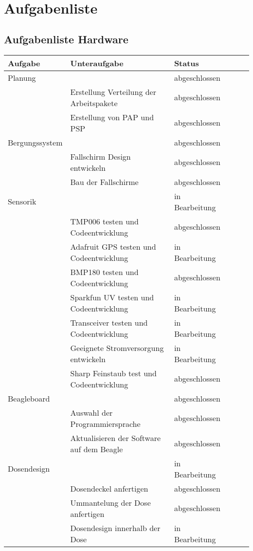 \section{Aufgabenliste}

\subsection{Aufgabenliste Hardware}
\begin{table}[H]
  \centering
    \begin{tabular}{p{3cm}p{7cm}p{3cm}rrr}
    \toprule
    \textbf{Aufgabe} & \textbf{Unteraufgabe} & \textbf{Status} \\
    \midrule
  	Planung & & abgeschlossen \\
	& Erstellung Verteilung der Arbeitspakete & abgeschlossen \\
	& Erstellung von PAP und PSP & abgeschlossen \\
	\midrule
	Bergungssystem & & abgeschlossen \\
	& Fallschirm Design entwickeln & abgeschlossen\\
	& Bau der Fallschirme & abgeschlossen\\
	\midrule
	Sensorik & & in Bearbeitung\\
	& TMP006 testen und Codeentwicklung & abgeschlossen\\
	& Adafruit GPS testen und Codeentwicklung & in Bearbeitung\\
	& BMP180 testen und Codeentwicklung & abgeschlossen\\
	& Sparkfun UV testen und Codeentwicklung & in Bearbeitung\\
	& Transceiver testen und Codeentwicklung & in Bearbeitung\\
	& Geeignete Stromversorgung entwickeln & in Bearbeitung\\
	& Sharp Feinstaub test und Codeentwicklung & abgeschlossen\\
	\midrule
	Beagleboard & & abgeschlossen\\
	& Auswahl der Programmiersprache & abgeschlossen\\
	& Aktualisieren der Software auf dem Beagle & abgeschlossen\\
	\midrule
	Dosendesign & & in Bearbeitung\\
	& Dosendeckel anfertigen & abgeschlossen\\
	& Ummantelung der Dose anfertigen & abgeschlossen\\
	& Dosendesign innerhalb der Dose & in Bearbeitung\\

\end{tabular}
\end{table}

